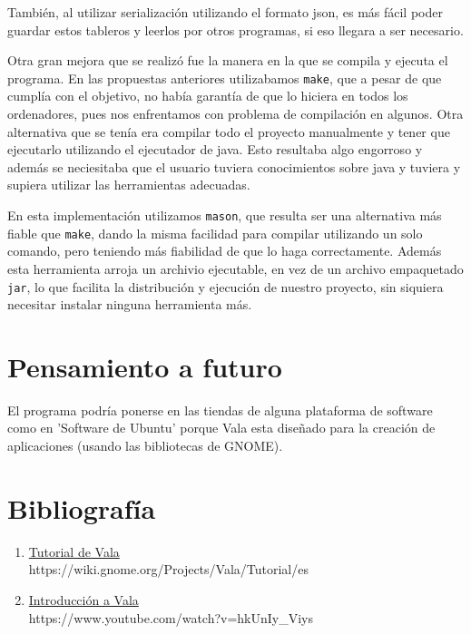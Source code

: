 \documentclass{article}
\begin{document}
	También, al utilizar serialización utilizando el formato json, es más fácil
	poder guardar estos tableros y leerlos por otros programas, si eso llegara
	a ser necesario.

	Otra gran mejora que se realizó fue la manera en la que se compila y ejecuta
	el programa. En las propuestas anteriores utilizabamos \texttt{make}, que a
	pesar de que cumplía con el objetivo, no había garantía de que lo hiciera en
	todos los ordenadores, pues nos enfrentamos con problema de compilación en
	algunos. Otra alternativa que se tenía era compilar todo el proyecto
	manualmente y tener que ejecutarlo utilizando el ejecutador de java. Esto
	resultaba algo engorroso y además se neciesitaba que el usuario tuviera
	conocimientos sobre java y tuviera y supiera utilizar las herramientas
	adecuadas.

	En esta implementación utilizamos \texttt{mason}, que resulta ser una
	alternativa más fiable que \texttt{make}, dando la misma facilidad para
	compilar utilizando un solo comando, pero teniendo más fiabilidad de que lo
	haga correctamente. Además esta herramienta arroja un archivio ejecutable,
	en vez de un archivo empaquetado \texttt{jar}, lo que facilita la
	distribución y ejecución de nuestro proyecto, sin siquiera necesitar
	instalar ninguna herramienta más.

    \section{Pensamiento a futuro}

    El programa podría ponerse en las tiendas de alguna plataforma de software como en 'Software de Ubuntu' porque Vala esta diseñado para la creación de aplicaciones (usando las bibliotecas de GNOME).

    \section*{Bibliografía}
    \newcommand*{\biblio}[2]{\item \href{#2}{#1}\\\textsf{#2}}
    \begin{enumerate}
        \biblio{Tutorial de Vala}{https://wiki.gnome.org/Projects/Vala/Tutorial/es}
        \biblio{Introducción a Vala}{https://www.youtube.com/watch?v=hkUnIy\_Viys}
    \end{enumerate}
\end{document}
